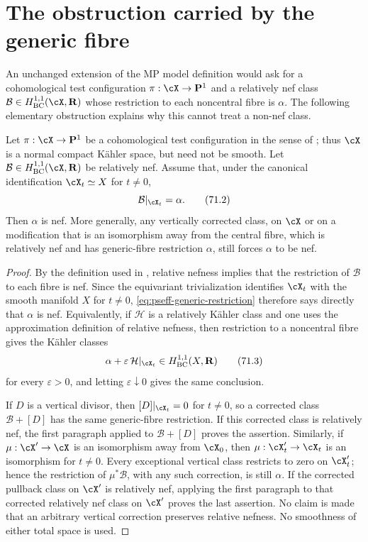 \section{The obstruction carried by the generic fibre}

An unchanged extension of the MP model definition would ask for a
cohomological test configuration
\(\pi:\cX\to\mathbf P^1\) and a relatively nef class
\(\mathcal B\in H^{1,1}_{\mathrm{BC}}(\cX,\mathbf R)\) whose restriction to
each noncentral fibre is \(\alpha\).  The following elementary obstruction
explains why this cannot treat a non-nef class.

\begin{proposition}\label{prop:pseff-relative-nef-obstruction}
Let \(\pi:\cX\to\mathbf P^1\) be a cohomological test configuration in
the sense of \cite[Definitions~2.5.1 and 4.1.2]{MP24}; thus \(\cX\) is a
normal compact K\"ahler space, but need not be smooth.  Let
\(\mathcal B\in H^{1,1}_{\mathrm{BC}}(\cX,\mathbf R)\) be relatively nef.
Assume that, under the canonical identification
\(\cX_t\simeq X\) for \(t\ne0\),
\[
                        \mathcal B|_{\cX_t}=\alpha.
\tag{71.2}\label{eq:pseff-generic-restriction}
\]
Then \(\alpha\) is nef.  More generally, any vertically corrected class,
on \(\cX\) or on a modification that is an isomorphism away from the
central fibre, which is relatively nef and has generic-fibre restriction
\(\alpha\), still forces \(\alpha\) to be nef.
\end{proposition}

\begin{proof}
By the definition used in \cite[Definition~4.1.2]{MP24}, relative
nefness implies that the restriction of \(\mathcal B\) to each fibre is
nef.  Since the equivariant trivialization identifies \(\cX_t\) with the
smooth manifold \(X\) for \(t\ne0\),
\eqref{eq:pseff-generic-restriction} therefore says directly that
\(\alpha\) is nef.  Equivalently, if \(\mathcal H\) is a relatively K\"ahler
class and one uses the approximation definition of relative nefness, then
restriction to a noncentral fibre gives the K\"ahler classes
\[
        \alpha+\varepsilon\,\mathcal H|_{\cX_t}
              \in H^{1,1}_{\mathrm{BC}}(X,\mathbf R)
\tag{71.3}\label{eq:pseff-nef-restriction}
\]
for every \(\varepsilon>0\), and letting \(\varepsilon\downarrow0\) gives
the same conclusion.

If \(D\) is a vertical divisor, then
\([D]|_{\cX_t}=0\) for \(t\ne0\), so a corrected class
\(\mathcal B+[D]\) has the same generic-fibre restriction.  If this
corrected class is relatively nef, the first paragraph applied to
\(\mathcal B+[D]\) proves the assertion.  Similarly, if
\(\mu:\cX'\to\cX\) is an isomorphism away from \(\cX_0\), then
\(\mu:\cX'_t\to\cX_t\) is an isomorphism for \(t\ne0\).  Every exceptional
vertical class restricts to zero on \(\cX'_t\); hence the restriction of
\(\mu^*\mathcal B\), with any such correction, is still \(\alpha\).
If the corrected pullback class on \(\cX'\) is relatively nef, applying
the first paragraph to that corrected relatively nef class on \(\cX'\)
proves the last assertion.  No claim is made that an arbitrary vertical
correction preserves relative nefness.  No smoothness of either total
space is used.
\end{proof}

